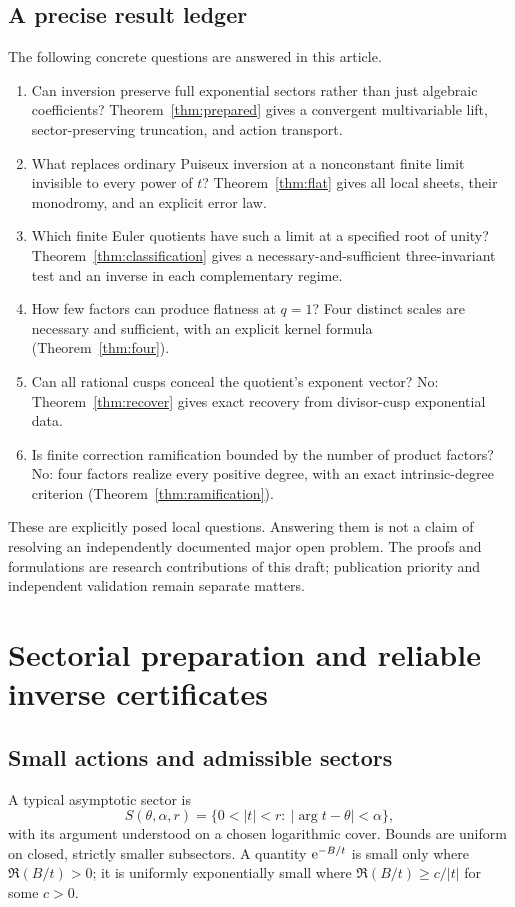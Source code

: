 \documentclass[11pt,a4paper]{article}
\numberwithin{equation}{section}
\theoremstyle{definition}\newtheorem{definition}[theorem]{Definition}
\theoremstyle{remark}\newtheorem{remark}[theorem]{Remark}
\begin{document}
\subsection{A precise result ledger}
The following concrete questions are answered in this article.
\begin{enumerate}[label=\textbf{Q\arabic*.},leftmargin=14mm]
\item Can inversion preserve full exponential sectors rather than just
algebraic coefficients? Theorem~\ref{thm:prepared} gives a convergent
multivariable lift, sector-preserving truncation, and action transport.
\item What replaces ordinary Puiseux inversion at a nonconstant finite
limit invisible to every power of $t$? Theorem~\ref{thm:flat} gives all
local sheets, their monodromy, and an explicit error law.
\item Which finite Euler quotients have such a limit at a specified root
of unity? Theorem~\ref{thm:classification} gives a necessary-and-sufficient
three-invariant test and an inverse in each complementary regime.
\item How few factors can produce flatness at $q=1$? Four distinct
scales are necessary and sufficient, with an explicit kernel formula
(Theorem~\ref{thm:four}).
\item Can all rational cusps conceal the quotient's exponent vector?
No: Theorem~\ref{thm:recover} gives exact recovery from divisor-cusp
exponential data.
\item Is finite correction ramification bounded by the number of product
factors? No: four factors realize every positive degree, with an exact
intrinsic-degree criterion (Theorem~\ref{thm:ramification}).
\end{enumerate}
These are explicitly posed local questions. Answering them is not a claim
of resolving an independently documented major open problem. The proofs
and formulations are research contributions of this draft; publication
priority and independent validation remain separate matters.

\section{Sectorial preparation and reliable inverse certificates}
\label{sec:foundations}

\subsection{Small actions and admissible sectors}
A typical asymptotic sector is
\[
 S(\theta,\alpha,r)=\{0<|t|<r:\ |\arg t-\theta|<\alpha\},
\]
with its argument understood on a chosen logarithmic cover. Bounds are
uniform on closed, strictly smaller subsectors. A quantity
$\mathrm e^{-B/t}$ is small only where $\Re(B/t)>0$; it is uniformly exponentially
small where $\Re(B/t)\ge c/|t|$ for some $c>0$.
\end{document}
